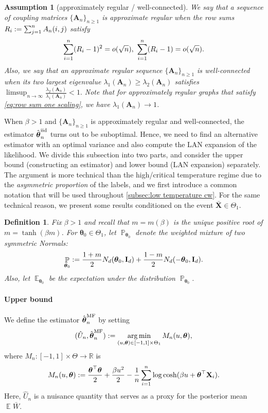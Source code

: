 \documentclass[preprint,reqno]{imsart}
\newtheorem{defi}{Definition}[section]
\newtheorem{assume}{Assumption}[section]
\newcommand{\ttheta}{\boldsymbol{\theta}}
\newcommand{\I}{\mathbf{I}_{\mathnormal{d}}}
\DeclareMathOperator{\QQCW}{\QQ_{\ttheta}^{\text{CW}}}
\DeclareMathOperator{\EE}{\mathbb{E}}
\DeclareMathOperator{\PP}{\mathbb{P}}
\DeclareMathOperator{\QQ}{\mathbb{Q}}
\newcommand{\A}{\mathbf{A}}
\newcommand{\X}{\mathbf{X}}
\DeclareMathOperator{\sumin}{\sum_{\mathnormal i=1}^{\mathnormal n}}
\DeclareMathOperator{\sumjn}{\sum_{\mathnormal j=1}^{\mathnormal n}}
\newcommand{\thetaiid}{\hat{\boldsymbol \theta}^{\text{iid}}_{\mathnormal n}}
\newcommand{\thetamf}{\hat{\boldsymbol \theta}^{\text{MF}}_{\mathnormal n}}
\DeclareMathOperator*{\argmin}{arg\,min}
\begin{document}
\begin{assume}[approximately regular / well-connected]\label{defi:regularity}
    We say that a sequence of coupling matrices $\{\A_n\}_{n \ge 1}$ is \emph{approximate regular} when the row sums $R_i := \sumjn A_n(i,j)$ satisfy
    \begin{equation*}
        \sumin (R_i - 1)^2 = o(\sqrt{n}), ~\sumin (R_i - 1) = o(\sqrt{n}).
    \end{equation*}
    Also, we say that an approximate regular sequence $\{\A_n\}_{n \ge 1}$ is \emph{well-connected} when its two largest eigenvalue $\lambda_1(\A_n) \ge \lambda_2(\A_n)$ satisfies $\limsup_{n \to \infty} \frac{\lambda_2(\A_n)}{\lambda_1(\A_n)} < 1.$ Note that for approximately regular graphs that satisfy \eqref{eq:row sum one scaling}, we have $\lambda_1(\A_n) \to 1$.
\end{assume}


When $\beta >1$ and $\{\A_n\}_{n \ge 1}$ is approximately regular and well-connected, the estimator $\thetaiid$ turns out to be suboptimal. Hence, we need to find an alternative estimator with an optimal variance and also compute the LAN expansion of the likelihood. We divide this subsection into two parts, and consider the upper bound (constructing an estimator) and lower bound (LAN expansion) separately. The argument is more technical than the high/critical temperature regime due to the \emph{asymmetric proportion} of the labels, and we first introduce a common notation that will be used throughout \cref{subsec:low temperature cw}.
%
For the same technical reason, we present some results conditioned on the event $\bar{\X} \in \Theta_1$. 

\begin{defi}\label{defi:EE ttheta}
    Fix $\beta > 1$ and recall that $m = m(\beta)$ is the unique positive root of $m = \tanh(\beta m)$. For $\ttheta_0 \in \Theta_1$, let $\PP_{\ttheta_0}$ denote the weighted mixture of two symmetric Normals: 
    $$\PP_{\ttheta_0} := \frac{1+m}{2} N_d(\ttheta_0, \I) + \frac{1-m}{2} N_d(-\ttheta_0, \I).$$ Also, let $\EE_{\ttheta_0}$ be the expectation under the distribution $\PP_{\ttheta_0}$. 
\end{defi}

\vspace{1mm}
\paragraph{Upper bound}
%
We define the estimator $\thetamf$ by setting
\begin{equation}\label{eq:mean-field estimator definition}
    (\hat{U}_n, \thetamf) := \argmin_{(u, \ttheta) \in [-1,1] \times \Theta_1} M_n(u, \ttheta),
\end{equation}
where $M_n: [-1,1] \times \Theta \to \mathbb{R}$
is %
\begin{align*}%
    M_n(u, \ttheta) := \frac{\ttheta^{\top} \ttheta}{2} + \frac{\beta u^2}{2} - \frac{1}{n} \sumin \log \cosh(\beta u + \ttheta^\top \X_i).
\end{align*}
Here, $\hat{U}_n$ is a nuisance quantity that serves as a proxy for the posterior mean $\EE^{\QQCW} \bar{W}$.
\end{document}
